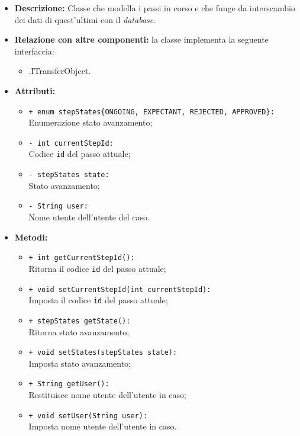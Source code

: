 \begin{flushleft}
\begin{itemize}
\item \textbf{Descrizione:} Classe che modella i passi in corso e che funge da interscambio dei dati di quest'ultimi con il \textit{database}.
\item \textbf{Relazione con altre componenti:} la classe implementa la seguente interfaccia:
		\begin{itemize}
			\item \smodel{}.ITransferObject.
		\end{itemize}
\item \textbf{Attributi:}
\begin{sloppypar}
\begin{itemize}
\item \texttt{+ enum stepStates\{ONGOING, EXPECTANT, REJECTED, APPROVED\}:}\\ Enumerazione stato avanzamento;
\item \texttt{- int currentStepId:}\\ Codice \texttt{id} del passo attuale;
\item \texttt{- stepStates state:}\\ Stato avanzamento;
\item \texttt{- String user:}\\ Nome utente dell'utente del caso.
\end{itemize}
\end{sloppypar}
\item \textbf{Metodi:}
\begin{sloppypar}
\begin{itemize}
\item \texttt{+ int getCurrentStepId():}\\ Ritorna il codice \texttt{id} del passo attuale;
\item \texttt{+ void setCurrentStepId(int currentStepId):}\\ Imposta il codice \texttt{id} del passo attuale;
\item \texttt{+ stepStates getState():}\\ Ritorna stato avanzamento;
\item \texttt{+ void setStates(stepStates state):}\\ Imposta stato avanzamento;
\item \texttt{+ String getUser():}\\ Restituisce nome utente dell'utente in caso;
\item \texttt{+ void setUser(String user):}\\ Imposta nome utente dell'utente in caso.
\end{itemize}
\end{sloppypar}
\end{itemize}
\end{flushleft}

